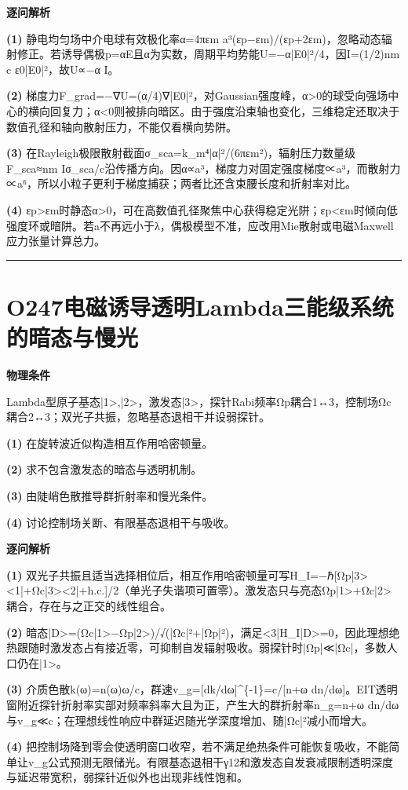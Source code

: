 \documentclass[UTF8,a4paper,11pt,oneside,openany]{ctexbook}
\begin{document}
\par\medskip\noindent\textbf{逐问解析}
\par\noindent\textbf{(1)} 静电均匀场中介电球有效极化率α=4πεm a³(εp−εm)/(εp+2εm)，忽略动态辐射修正。若诱导偶极p=αE且α为实数，周期平均势能U=−α|E0|²/4，因I=(1/2)nm c ε0|E0|²，故U∝−α I。
\par\noindent\textbf{(2)} 梯度力F\_grad=−∇U=(α/4)∇|E0|²，对Gaussian强度峰，α>0的球受向强场中心的横向回复力；α<0则被排向暗区。由于强度沿束轴也变化，三维稳定还取决于数值孔径和轴向散射压力，不能仅看横向势阱。
\par\noindent\textbf{(3)} 在Rayleigh极限散射截面σ\_sca=k\_m⁴|α|²/(6πεm²)，辐射压力数量级F\_sca≈nm Iσ\_sca/c沿传播方向。因α∝a³，梯度力对固定强度梯度∝a³，而散射力∝a⁶，所以小粒子更利于梯度捕获；两者比还含束腰长度和折射率对比。
\par\noindent\textbf{(4)} εp>εm时静态α>0，可在高数值孔径聚焦中心获得稳定光阱；εp<εm时倾向低强度环或暗阱。若a不再远小于λ，偶极模型不准，应改用Mie散射或电磁Maxwell应力张量计算总力。

\par\bigskip\hrule\bigskip
\section*{O247\quad 电磁诱导透明Lambda三能级系统的暗态与慢光}
\textbf{物理条件}\par Lambda型原子基态|1>,|2>，激发态|3>，探针Rabi频率Ωp耦合1↔3，控制场Ωc耦合2↔3；双光子共振，忽略基态退相干并设弱探针。
\par\noindent\textbf{(1)} 在旋转波近似构造相互作用哈密顿量。
\par\noindent\textbf{(2)} 求不包含激发态的暗态与透明机制。
\par\noindent\textbf{(3)} 由陡峭色散推导群折射率和慢光条件。
\par\noindent\textbf{(4)} 讨论控制场关断、有限基态退相干与吸收。

\par\medskip\noindent\textbf{逐问解析}
\par\noindent\textbf{(1)} 双光子共振且适当选择相位后，相互作用哈密顿量可写H\_I=−ℏ[Ωp|3><1|+Ωc|3><2|+h.c.]/2（单光子失谐项可置零）。激发态只与亮态Ωp|1>+Ωc|2>耦合，存在与之正交的线性组合。
\par\noindent\textbf{(2)} 暗态|D>=(Ωc|1>−Ωp|2>)/√(|Ωc|²+|Ωp|²)，满足<3|H\_I|D>=0，因此理想绝热跟随时激发态占有接近零，可抑制自发辐射吸收。弱探针时|Ωp|≪|Ωc|，多数人口仍在|1>。
\par\noindent\textbf{(3)} 介质色散k(ω)=n(ω)ω/c，群速v\_g=[dk/dω]\textasciicircum{}\{-1\}=c/[n+ω dn/dω]。EIT透明窗附近探针折射率实部对频率斜率大且为正，产生大的群折射率n\_g=n+ω dn/dω与v\_g≪c；在理想线性响应中群延迟随光学深度增加、随|Ωc|²减小而增大。
\par\noindent\textbf{(4)} 把控制场降到零会使透明窗口收窄，若不满足绝热条件可能恢复吸收，不能简单让v\_g公式预测无限储光。有限基态退相干γ12和激发态自发衰减限制透明深度与延迟带宽积，弱探针近似外也出现非线性饱和。
\end{document}
